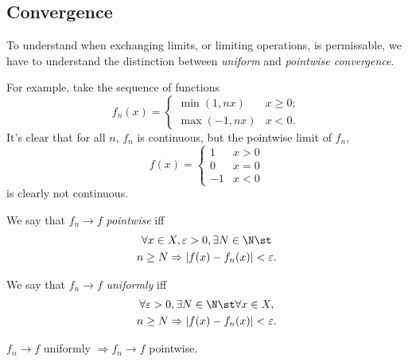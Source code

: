 \documentclass{notes}
\begin{document}
\subsection{Convergence}
To understand when exchanging limits, or limiting operations, is permissable, we have to understand 
the distinction between \emph{uniform} and \emph{pointwise convergence}.

For example, take the sequence of functions 
$$f_n(x) = \begin{cases} \min(1, nx) &x \geq 0; \\ \max(-1, nx) &x < 0. \end{cases}$$
It's clear that for all $n$, $f_n$ is continuous, but the pointwise limit of $f_n$, 
$$f(x) = \begin{cases} 1 &x > 0 \\ 0 &x = 0 \\ -1 &x< 0 \end{cases}$$
is clearly not continuous.

\begin{defn}
  We say that $f_n \to f$ \emph{pointwise} iff 
  \begin{gather*}
    \forall x\in X, \varepsilon > 0, \exists N\in\N \st \\
    n \geq N \Rightarrow |f(x) - f_n(x)| < \varepsilon.
  \end{gather*}
\end{defn}

\begin{defn}
  We say that $f_n \to f$ \emph{uniformly} iff 
  \begin{gather*}
    \forall \varepsilon > 0, \exists N\in\N \st \forall x\in X,\\
    n \geq N \Rightarrow |f(x) - f_n(x)| < \varepsilon.
  \end{gather*}
\end{defn}

\begin{theorem}
  $f_n \to f$ uniformly $\Rightarrow f_n \to f$ pointwise.
\end{theorem}
\end{document}
